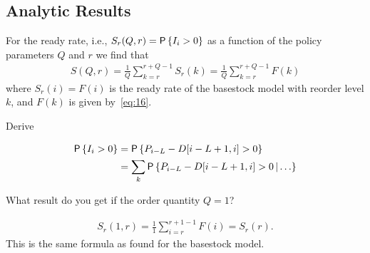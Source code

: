 \subsection{Analytic Results}

For  the ready rate, i.e., $S_r(Q,r) = \P{\IL_i > 0}$ as a function of the policy parameters $Q$ and $r$ we find that
\begin{align}\label{eq:5}
   S(Q,r) = \frac1Q \sum_{k=r}^{r+Q-1} S_r(k) = \frac1Q \sum_{k=r}^{r+Q-1} F(k) 
\end{align}
where $S_r(i)=F(i)$ is the ready rate  of the basestock model with reorder
level $k$, and $F(k)$ is given by~\eqref{eq:16}. 

\begin{exercise}[\faRocket]
Derive
\begin{solution}

\begin{align*}
  \P{\IL_i > 0} 
&= \P{\IP_{i-L} - D[i-L+1, i] >0} \\
&= \sum_{k}\P{\IP_{i-L} - D[i-L+1, i] >0\given \ldots} \\
\end{align*}
\end{solution}
\end{exercise}

\begin{exercise}
  What result do you get if the order quantity $Q=1$? 
  \begin{solution}
\begin{align*}
   S_r(1,r) = \frac11 \sum_{i=r}^{r+1-1} F(i) = S_r(r).
\end{align*}
This is the same formula as found for the basestock model.
  \end{solution}
\end{exercise}

